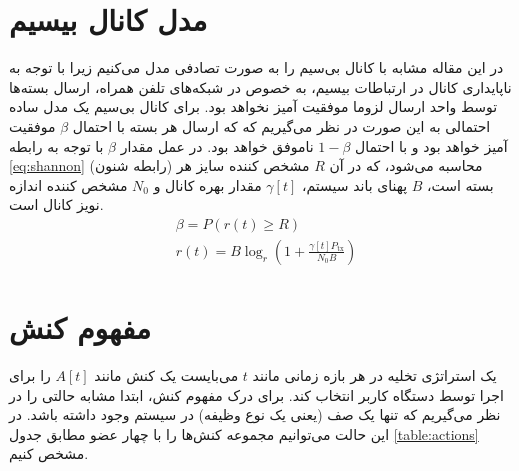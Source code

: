\section{مدل کانال بیسیم}
\label{sec:wireless}
در این مقاله مشابه با \cite{Liu} کانال بی‌سیم را به صورت تصادفی مدل می‌کنیم زیرا با توجه به ناپایداری کانال در ارتباطات بیسیم، به خصوص در شبکه‌های تلفن همراه، ارسال بسته‌ها توسط واحد ارسال لزوما موفقیت آمیز نخواهد بود. برای کانال بی‌سیم یک مدل ساده احتمالی به این صورت در نظر می‌گیریم که که ارسال هر بسته با احتمال \(\beta\) موفقیت آمیز خواهد بود و با احتمال \(1 - \beta\) ناموفق خواهد بود. در عمل مقدار \(\beta\) با توجه به رابطه \ref{eq:shannon} (رابطه شنون) محاسبه می‌شود، که در آن \(R\) مشخص کننده سایز هر بسته است، \(B\) پهنای باند سیستم، \(\gamma[t]\) مقدار بهره کانال و \(N_0\) مشخص کننده اندازه نویز کانال است.
\begin{equation}
	\label{eq:shannon}
	\begin{aligned}
		&\beta=P(r(t) \geq R) \\
		&r(t)=B \log _{r}\left(1+\frac{\gamma[t] P_{\mathrm{tx}}}{N_0 B}\right)
	\end{aligned}
\end{equation}
\section{مفهوم کنش}
\label{sec:action}
یک استراتژی تخلیه در هر بازه زمانی مانند \(t\) می‌بایست یک کنش مانند \(A[t]\) را برای اجرا توسط دستگاه کاربر انتخاب کند. برای درک مفهوم کنش، ابتدا مشابه \cite{Liu} حالتی را در نظر می‌گیریم که تنها یک صف (یعنی یک نوع وظیفه) در سیستم وجود داشته باشد. در این حالت می‌توانیم مجموعه کنش‌ها را با چهار عضو مطابق جدول \ref{table:actions} مشخص کنیم.

